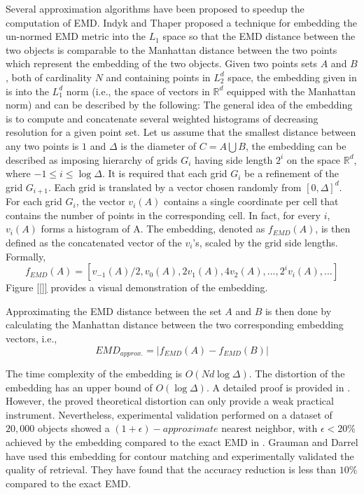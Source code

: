 \iftoggle{edit-mode}{\hspace{0pt}\marginpar{Indyk and Thaper Embedding}}{}
Several approximation algorithms have been proposed to speedup the computation of EMD. 
Indyk and Thaper \cite{indyk2003fast} proposed a technique for embedding the un-normed EMD metric into the $L_1$ space so that the EMD distance between the two objects is comparable to the Manhattan distance between the two points which represent the embedding of the two objects.  
Given two points sets $A$ and $B$, both of cardinality $N$ and containing points in $L_2^d$ space, the embedding given in \cite{indyk2003fast} is into the $L_1^d$ norm (i.e., the space of vectors in $\mathbb{R}^d$ equipped with the Manhattan norm) and can be described by the following: 
The general idea of the embedding is to compute and concatenate several weighted histograms of decreasing resolution for a given point set. Let us assume that the smallest distance between any two points is $1$ and $\Delta$ is the diameter of $C=A \bigcup B$, the embedding can be described as imposing hierarchy of grids $G_i$ having side length $2^i$ on the space $\mathbb{R}^d$, where $-1 \leq i \leq \log \Delta$. It is required that each grid $G_{i}$ be a refinement of the grid $G_{i+1}$. 
Each grid is translated by a vector chosen randomly from $[0, \Delta]^d$. For each grid $G_i$, the vector $v_i(A)$ contains a single coordinate per cell that contains the number of points in the corresponding cell. In fact, for every $i$, $v_i(A)$ forms a histogram of A. The embedding, denoted as $f_{EMD}(A)$, is then defined as the concatenated vector of the $v_i$'s, scaled by the grid side lengths. Formally,
\begin{equation}
f_{EMD}(A) = [v_{-1}(A)/2, v_0(A), 2v_1(A), 4v_2(A),..., 2^iv_i(A),...]
\end{equation} 
Figure \ref{[]} provides a visual demonstration of the embedding.

Approximating the EMD distance between the set $A$ and $B$ is then done by calculating the Manhattan distance between the two corresponding embedding vectors, i.e.,
\begin{equation}
EMD_{approx.}=|f_{EMD}(A) - f_{EMD}(B)|
\end{equation}  

\iftoggle{edit-mode}{\hspace{0pt}\marginpar{Performance}}{} 
The time complexity of the embedding is $O(Nd \log{\Delta})$. The distortion of the embedding has an upper bound of $O(\log \Delta)$. A detailed proof is provided in \cite{indyk2003fast}. However, the proved theoretical distortion can only provide a weak practical instrument. Nevertheless, experimental validation performed on a dataset of $20,000$ objects showed a $(1+\epsilon)-approximate$ nearest neighbor, with $\epsilon < 20\%$ achieved by the embedding compared to the exact EMD in \cite{indyk2003fast}. Grauman and Darrel \cite{grauman2004fast} have used this embedding for contour matching and experimentally validated the quality of retrieval. They have found that the accuracy reduction is less than $10\%$ compared to the exact EMD.

